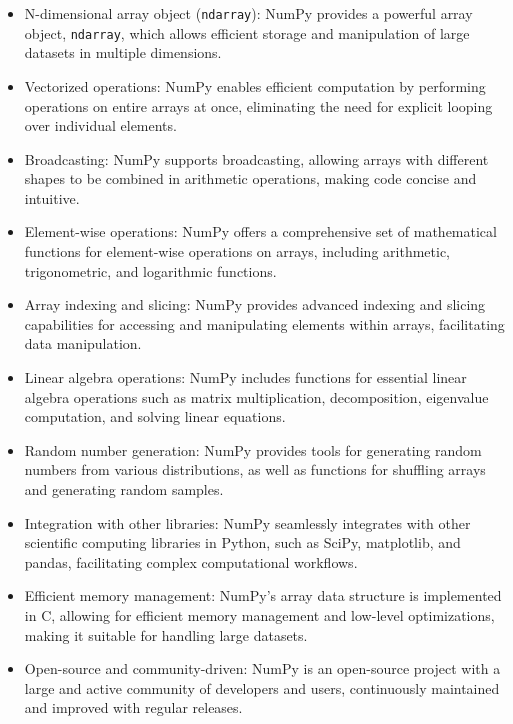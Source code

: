 \begin{itemize}
	\item N-dimensional array object (\texttt{ndarray}): NumPy provides a powerful
	array object, \texttt{ndarray}, which allows efficient storage and
	manipulation of large datasets in multiple dimensions.
	
	\item Vectorized operations: NumPy enables efficient computation by performing
	operations on entire arrays at once, eliminating the need for explicit looping
	over individual elements.
	
	\item Broadcasting: NumPy supports broadcasting, allowing arrays with different
	shapes to be combined in arithmetic operations, making code concise and
	intuitive.
	
	\item Element-wise operations: NumPy offers a comprehensive set of
	mathematical functions for element-wise operations on arrays, including arithmetic,
	trigonometric, and logarithmic functions.
	
	\item Array indexing and slicing: NumPy provides advanced indexing and slicing
	capabilities for accessing and manipulating elements within arrays, facilitating
	data manipulation.
	
	\item Linear algebra operations: NumPy includes functions for essential linear
	algebra operations such as matrix multiplication, decomposition, eigenvalue
	computation, and solving linear equations.
	
	\item Random number generation: NumPy provides tools for generating random
	numbers from various distributions, as well as functions for shuffling arrays
	and generating random samples.\cite{NumPy:2024}
	
	\item Integration with other libraries: NumPy seamlessly integrates with other
	scientific computing libraries in Python, such as SciPy, matplotlib, and pandas,
	facilitating complex computational workflows.
	
	\item Efficient memory management: NumPy's array data structure is implemented
	in C, allowing for efficient memory management and low-level optimizations,
	making it suitable for handling large datasets.
	
	\item Open-source and community-driven: NumPy is an open-source project with a
	large and active community of developers and users, continuously maintained and
	improved with regular releases.
\end{itemize}

